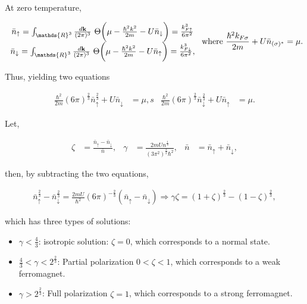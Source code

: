 
At zero temperature, 

\begin{align}
\begin{array}{c}
    {\bar n}_\uparrow = \int_{\mathds{R}^3} \frac{d {\bf k}}{(2\pi)^3} \blanky \Theta\bigg( \mu - \frac{\hbar^2 k^2}{2m} - U \bar{n}_\downarrow\bigg) = \frac{k_{F\uparrow}^3}{6\pi^2} \\
    {\bar n}_\downarrow = \int_{\mathds{R}^3} \frac{d {\bf k}}{(2\pi)^3} \blanky \Theta\bigg( \mu - \frac{\hbar^2 k^2}{2m} - U \bar{n}_\uparrow\bigg) = \frac{k_{F\downarrow}^3}{6\pi^2},
\end{array}
\textnormal{ where } \frac{\hbar^2 k_{F \sigma}}{2m} + U \bar{n}_{(\sigma)^{*}} = \mu.
\end{align}

Thus, yielding two equations 

\begin{align}
    \frac{\hbar^2}{2m} (6\pi)^{\frac{2}{3}} {\bar n}_{\uparrow}^{\frac{2}{3}} + U {\bar n}_{\downarrow} &= \mu,s & \frac{\hbar^2}{2m} (6\pi)^{\frac{2}{3}} {\bar n}_{\downarrow}^{\frac{2}{3}} + U {\bar n}_{\uparrow} &= \mu.
\end{align}

Let, 

\begin{align*}
    \zeta &= \frac{{\bar n}_{\uparrow}-{\bar n}_{\downarrow}}{{\bar n}}, & \gamma &= \frac{2m U n^{\frac{1}{3}}}{(3\pi^2)^{\frac{3}{2}} \hbar^2}, & {\bar n} &= {\bar n}_{\uparrow} + {\bar n}_{\downarrow},
\end{align*}

then, by subtracting the two equations,

\begin{align}
    {\bar n}_{\uparrow}^{\frac{2}{3}} - {\bar n}_{\downarrow}^{\frac{2}{3}} = \frac{2mU}{\hbar^2} (6\pi)^{-\frac{2}{3}} ({\bar n}_{\uparrow}-{\bar n}_{\downarrow}) \Rightarrow \gamma \zeta = (1+\zeta)^{\frac{2}{3}} - (1-\zeta)^{\frac{2}{3}},
\end{align}

which has three types of solutions:

\begin{itemize}
    \item $\gamma < \frac{4}{3}$: isotropic solution: $\zeta = 0$, which corresponds to a normal state.
    \item $\frac{4}{3} < \gamma < 2^{\frac{2}{3}}$: Partial polarization $0 < \zeta < 1$, which corresponds to a weak ferromagnet.
    \item $\gamma > 2^{\frac{2}{3}}$: Full polarization $\zeta = 1$, which corresponds to a strong ferromagnet. \\
\end{itemize}

